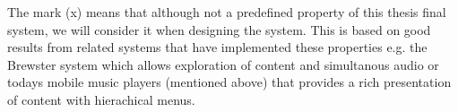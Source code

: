 The mark (x) means that although not a predefined property of this thesis final system, we will consider it when designing the system. This is based on good results from related systems that have implemented these properties e.g. the Brewster \cite{brewster_multimodaleyes-freeinteraction_2003} system which allows exploration of content and simultanous audio or todays mobile music players (mentioned above) that provides a rich presentation of content with hierachical menus.












